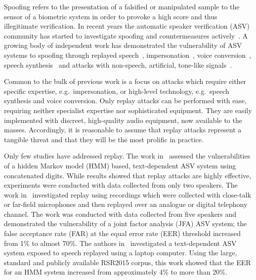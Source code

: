 
Spoofing refers to the presentation of a falsified or manipulated sample 
to the sensor of a biometric system in order to provoke a high score and 
thus illegitimate verification.
In recent years the automatic speaker verification (ASV) community has 
started to investigate spoofing and countermeasures 
actively~\cite{interspeechSpecialSession, Wu2014a}. 
A growing 
body of independent work has demonstrated the vulnerability of ASV 
systems to spoofing through 
replayed speech~\cite{Lindberg1999,Villalba2010},
impersonation~\cite{Blomberg2004,Farrus2008}, voice 
conversion~\cite{Perrot2005, Pellom1999}, speech 
synthesis~\cite{Masuko1999, Leon2010} and attacks with non-speech, 
artificial, tone-like signals~\cite{Alegre2012a,Alegre2012b}.

Common to the bulk of previous work is a focus on attacks 
which require either specific expertise, e.g.~impersonation, or high-level 
technology, e.g.~speech synthesis and voice conversion. 
Only replay attacks can be performed with ease, requiring neither specialist 
expertise nor sophisticated equipment.  They are easily 
implemented %
with discreet, high-quality audio equipment, now available to the masses.
Accordingly, it is reasonable to assume that replay attacks represent a tangible threat and that they will be the most prolific
in practice.  
%

Only few studies have addressed replay.  
The work in~\cite{Lindberg1999} assessed the vulnerabilities of a hidden Markov model (HMM) based, text-dependent ASV system using concatenated digits.  
While results showed that replay attacks are highly effective, experiments were conducted with data collected from only two speakers.
The work in~\cite{Villalba2010} investigated replay using recordings which were collected with close-talk or far-field microphones and then replayed over an analogue or digital telephony channel. 
The work was conducted with data collected from five speakers and demonstrated the vulnerability of a joint factor analysis (JFA) ASV system; the false acceptance rate (FAR) at the equal error rate (EER) threshold increased from 1\% to almost 70\%. 
The authors in~\cite{Wu2014} investigated a text-dependent 
ASV system exposed to speech replayed using a laptop computer. 
Using the large, standard and publicly available RSR2015 corpus, this work showed that the EER for an HMM system increased from approximately 4\% to more than 20\%. %

